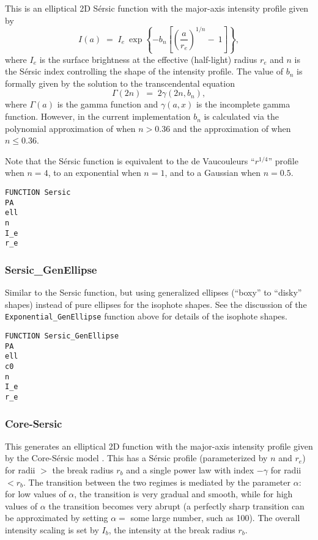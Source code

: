 \documentclass[10pt,a4paper,article]{memoir}
\begin{document}
This is an elliptical 2D S\'ersic function with the major-axis intensity
profile given by
\begin{equation}
I(a) \; = \; I_{e} \: \exp \left\{ -b_{n} \left[ \left( \frac{a}{r_{e}} \right)^{1/n} \! - \: 1 \right] \right\},
\end{equation}
where $I_{e}$ is the surface brightness at the effective (half-light) radius $r_{e}$
and $n$ is the S\'ersic index controlling the shape of the intensity profile. The
value of $b_{n}$ is formally given by the solution to the transcendental equation
\begin{equation}
\Gamma(2 n) \; = \; 2 \gamma(2n, b_{n}),
\end{equation}
where $\Gamma(a)$ is the gamma function and $\gamma(a, x)$ is the incomplete gamma function.
However, in the current implementation $b_{n}$ is calculated via the polynomial approximation
of \citet{ciotti99} when $n > 0.36$ and the approximation of \citet{macarthur03} when
$n \leq 0.36$.

Note that the S\'ersic function is equivalent to the de Vaucouleurs ``$r^{1/4}$'' profile
when $n = 4$, to an exponential when $n = 1$, and to a Gaussian when $n = 0.5$.

\begin{verbatim}
FUNCTION Sersic
PA
ell
n
I_e
r_e
\end{verbatim}


\subsubsection{Sersic\_GenEllipse}

Similar to the Sersic function, but using generalized ellipses (``boxy'' to
``disky'' shapes) instead of pure ellipses for the isophote shapes.  See the
discussion of the \texttt{Exponential\_GenEllipse} function above for details of the isophote
shapes.

\begin{verbatim}
FUNCTION Sersic_GenEllipse
PA
ell
c0
n
I_e
r_e
\end{verbatim}



\subsubsection{Core-Sersic}

This generates an elliptical 2D function with the major-axis intensity profile
given by the Core-S{\'e}rsic model \citep{graham03,trujillo04}. This has a
S\'ersic profile (parameterized by $n$ and $r_{e}$) for radii $>$ the break
radius $r_{b}$ and a single power law with index $-\gamma$ for radii $< r_{b}$.
The transition between the two regimes is mediated by the parameter $\alpha$:
for low values of $\alpha$, the transition is very gradual and smooth, while for
high values of $\alpha$ the transition becomes very abrupt (a perfectly sharp
transition can be approximated by setting $\alpha =$
some large number, such as 100). The overall intensity scaling is set by $I_{b}$,
the intensity at the break radius $r_{b}$.
\end{document}
